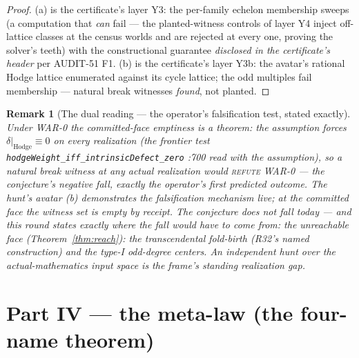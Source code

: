 \documentclass[11pt]{article}
\newtheorem{remark}[theorem]{Remark}
\begin{document}
\begin{proof}
(a) is the certificate's layer Y3: the per-family echelon membership sweeps (a computation that \emph{can} fail --- the planted-witness controls of layer Y4 inject off-lattice classes at the census worlds and are rejected at every one, proving the solver's teeth) with the constructional guarantee \emph{disclosed in the certificate's header} per AUDIT-51 F1. (b) is the certificate's layer Y3b: the avatar's rational Hodge lattice enumerated against its cycle lattice; the odd multiples fail membership --- natural break witnesses \emph{found}, not planted. \qedhere
\end{proof}

\begin{remark}[The dual reading --- the operator's falsification test, stated exactly]
Under WAR-0 the committed-face emptiness is a \emph{theorem}: the assumption forces $\delta|_{\mathrm{Hodge}}\equiv0$ on every realization (the frontier test \texttt{hodgeWeight\_iff\_intrinsicDefect\_zero} :700 read with the assumption), so a natural break witness at any \emph{actual} realization would \textsc{refute} WAR-0 --- the conjecture's \emph{negative} fall, exactly the operator's first predicted outcome. The hunt's avatar (b) demonstrates the falsification mechanism live; at the committed face the witness set is empty by receipt. \emph{The conjecture does not fall today --- and this round states exactly where the fall would have to come from: the unreachable face} (Theorem~\ref{thm:reach}): the transcendental fold-birth (R32's named construction) and the type-I odd-degree centers. An independent hunt over the actual-mathematics input space is the frame's standing realization gap.
\end{remark}

\section{Part IV --- the meta-law (the four-name theorem)}
\end{document}
